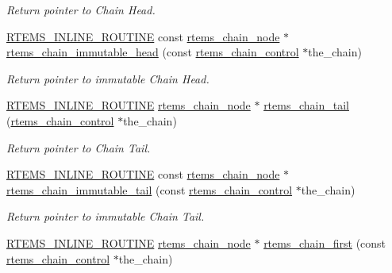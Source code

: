 \begin{DoxyCompactItemize}
\begin{DoxyCompactList}\small\item\em Return pointer to Chain Head. \end{DoxyCompactList}\item 
\mbox{\hyperlink{group__RTEMSScoreBaseDefs_gac216239df231d5dbd15e3520b0b9313f}{R\+T\+E\+M\+S\+\_\+\+I\+N\+L\+I\+N\+E\+\_\+\+R\+O\+U\+T\+I\+NE}} const \mbox{\hyperlink{structChain__Node__struct}{rtems\+\_\+chain\+\_\+node}} $\ast$ \mbox{\hyperlink{group__ClassicChains_ga775171784e4b0de791519f2853519edb}{rtems\+\_\+chain\+\_\+immutable\+\_\+head}} (const \mbox{\hyperlink{unionChain__Control}{rtems\+\_\+chain\+\_\+control}} $\ast$the\+\_\+chain)
\begin{DoxyCompactList}\small\item\em Return pointer to immutable Chain Head. \end{DoxyCompactList}\item 
\mbox{\hyperlink{group__RTEMSScoreBaseDefs_gac216239df231d5dbd15e3520b0b9313f}{R\+T\+E\+M\+S\+\_\+\+I\+N\+L\+I\+N\+E\+\_\+\+R\+O\+U\+T\+I\+NE}} \mbox{\hyperlink{structChain__Node__struct}{rtems\+\_\+chain\+\_\+node}} $\ast$ \mbox{\hyperlink{group__ClassicChains_gabf61205eb68029cabb6e06322454af34}{rtems\+\_\+chain\+\_\+tail}} (\mbox{\hyperlink{unionChain__Control}{rtems\+\_\+chain\+\_\+control}} $\ast$the\+\_\+chain)
\begin{DoxyCompactList}\small\item\em Return pointer to Chain Tail. \end{DoxyCompactList}\item 
\mbox{\hyperlink{group__RTEMSScoreBaseDefs_gac216239df231d5dbd15e3520b0b9313f}{R\+T\+E\+M\+S\+\_\+\+I\+N\+L\+I\+N\+E\+\_\+\+R\+O\+U\+T\+I\+NE}} const \mbox{\hyperlink{structChain__Node__struct}{rtems\+\_\+chain\+\_\+node}} $\ast$ \mbox{\hyperlink{group__ClassicChains_ga9b58da3ec9a1a90e6fc196d8783b7dc7}{rtems\+\_\+chain\+\_\+immutable\+\_\+tail}} (const \mbox{\hyperlink{unionChain__Control}{rtems\+\_\+chain\+\_\+control}} $\ast$the\+\_\+chain)
\begin{DoxyCompactList}\small\item\em Return pointer to immutable Chain Tail. \end{DoxyCompactList}\item 
\mbox{\hyperlink{group__RTEMSScoreBaseDefs_gac216239df231d5dbd15e3520b0b9313f}{R\+T\+E\+M\+S\+\_\+\+I\+N\+L\+I\+N\+E\+\_\+\+R\+O\+U\+T\+I\+NE}} \mbox{\hyperlink{structChain__Node__struct}{rtems\+\_\+chain\+\_\+node}} $\ast$ \mbox{\hyperlink{group__ClassicChains_ga44b92f7e9e25d9a3a0eadb0b559398cc}{rtems\+\_\+chain\+\_\+first}} (const \mbox{\hyperlink{unionChain__Control}{rtems\+\_\+chain\+\_\+control}} $\ast$the\+\_\+chain)

\end{DoxyCompactItemize}
